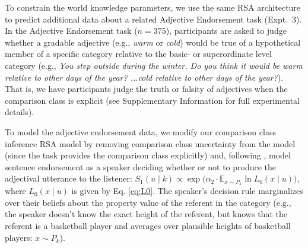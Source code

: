 \documentclass[doc]{apa6}
\begin{document}
To constrain the world knowledge parameters, we use the same RSA architecture to predict additional data about a related Adjective Endorsement task (Expt.~3).
In the Adjective Endorsement task ($n=375$), participants are asked to judge whether a gradable adjective (e.g., \emph{warm} or \emph{cold}) would be true of a hypothetical member of a specific category relative to the basic- or superordinate level category (e.g., \emph{You step outside during the winter. Do you think it would be warm relative to other days of the year? ...cold relative to other days of the year?}).
That is, we have participants judge the truth or falsity of adjectives when the comparison class is explicit (see Supplementary Information for full experimental details).

To model the adjective endorsement data, we modify our comparison class inference RSA model by removing comparison class uncertainty from the model (since the task provides the comparison class explicitly) and, following , model sentence endorsement as a speaker deciding whether or not to produce the adjectival utterance to the listener: $S_{1}(u \mid k) \propto \exp{(\alpha_2 \cdot {\mathbb E}_{x\sim P_{k}}} \ln{L_0(x \mid u)})$, where $L_0(x \mid u)$ is given by Eq. \ref{eq:L0}.
The speaker's decision rule marginalizes over their beliefs about the property value of the referent in the category (e.g., the speaker doesn't know the exact height of the referent, but knows that the referent is a basketball player and averages over plausible heights of basketball players: $x\sim P_{k}$).
\end{document}
